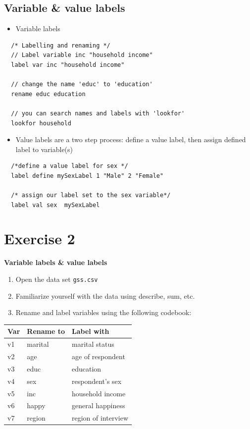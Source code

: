 \documentclass[]{book}
\providecommand{\tightlist}{%
  \setlength{\itemsep}{0pt}\setlength{\parskip}{0pt}}
\begin{document}
\subsection{Variable \& value labels}\label{variable-value-labels}

\begin{itemize}
\tightlist
\item
  Variable labels
\end{itemize}

\begin{verbatim}
  /* Labelling and renaming */
  // Label variable inc "household income"
  label var inc "household income"

  // change the name 'educ' to 'education'
  rename educ education

  // you can search names and labels with 'lookfor' 
  lookfor household
\end{verbatim}

\begin{itemize}
\tightlist
\item
  Value labels are a two step process: define a value label, then assign
  defined label to variable(s)
\end{itemize}

\begin{verbatim}
  /*define a value label for sex */
  label define mySexLabel 1 "Male" 2 "Female"

  /* assign our label set to the sex variable*/
  label val sex  mySexLabel
\end{verbatim}

\section{Exercise 2}\label{exercise-2-4}

\textbf{Variable labels \& value labels}

\begin{enumerate}
\def\labelenumi{\arabic{enumi}.}
\tightlist
\item
  Open the data set \texttt{gss.csv}
\item
  Familiarize yourself with the data using describe, sum, etc.
\item
  Rename and label variables using the following codebook:
\end{enumerate}

\begin{longtable}[]{@{}lll@{}}
\toprule
Var & Rename to & Label with\tabularnewline
\midrule
\endhead
v1 & marital & marital status\tabularnewline
v2 & age & age of respondent\tabularnewline
v3 & educ & education\tabularnewline
v4 & sex & respondent's sex\tabularnewline
v5 & inc & household income\tabularnewline
v6 & happy & general happiness\tabularnewline
v7 & region & region of interview\tabularnewline
\bottomrule
\end{longtable}
\end{document}
